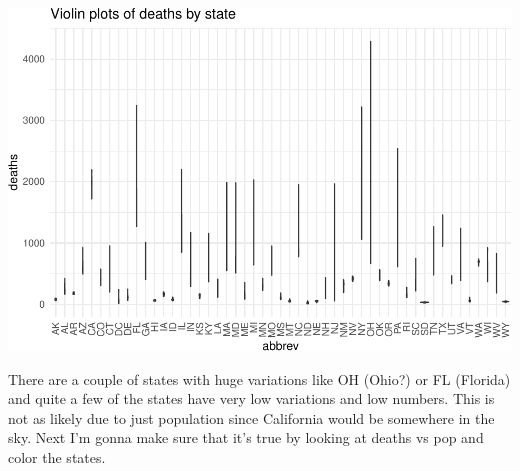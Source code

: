 \documentclass[]{article}
\newenvironment{Shaded}{\begin{snugshade}}{\end{snugshade}}
\newcommand{\CommentTok}[1]{\textcolor[rgb]{0.56,0.35,0.01}{\textit{#1}}}
\newcommand{\DataTypeTok}[1]{\textcolor[rgb]{0.13,0.29,0.53}{#1}}
\newcommand{\DecValTok}[1]{\textcolor[rgb]{0.00,0.00,0.81}{#1}}
\newcommand{\FloatTok}[1]{\textcolor[rgb]{0.00,0.00,0.81}{#1}}
\newcommand{\KeywordTok}[1]{\textcolor[rgb]{0.13,0.29,0.53}{\textbf{#1}}}
\newcommand{\NormalTok}[1]{#1}
\newcommand{\OperatorTok}[1]{\textcolor[rgb]{0.81,0.36,0.00}{\textbf{#1}}}
\newcommand{\StringTok}[1]{\textcolor[rgb]{0.31,0.60,0.02}{#1}}
\begin{document}
\begin{Shaded}
\end{Shaded}

\includegraphics{Assignment_1_files/figure-latex/plots2-1.pdf}

There are a couple of states with huge variations like OH (Ohio?) or FL
(Florida) and quite a few of the states have very low variations and low
numbers. This is not as likely due to just population since California
would be somewhere in the sky. Next I'm gonna make sure that it's true
by looking at deaths vs pop and color the states.

\begin{Shaded}
\end{Shaded}
\end{document}
